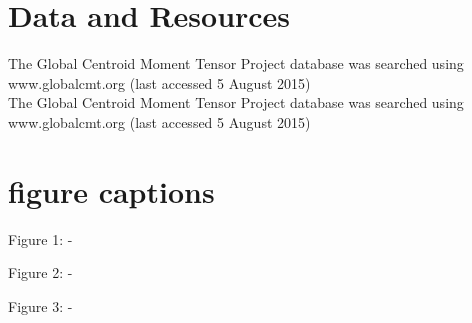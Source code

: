 \documentclass[12pt,reqno,letter]{article} %
\begin{document}


\newpage

\section*{Data and Resources}
The Global Centroid Moment Tensor Project database was searched using www.globalcmt.org (last accessed 5 August 2015)\\

\noindent
The Global Centroid Moment Tensor Project database was searched using www.globalcmt.org (last accessed 5 August 2015)\\


\noindent
\section*{figure captions}

\noindent
Figure 1: -

\noindent
Figure 2: -

\noindent
Figure 3: -


\noindent   
\noindent   
\end{document}
